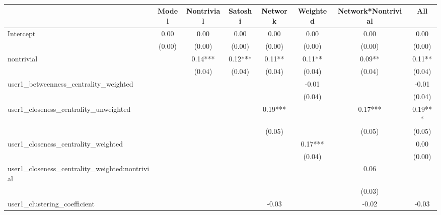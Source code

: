 \begin{table}
\centering
\caption{}
\begin{center}
\begin{tabular}{lccccccc}
\hline
                                               & Model    & Nontrivial & Satoshi & Network & Weighted & Network*Nontrivial &   All    \\
\hline
\hline

Intercept                                      & 0.00     & 0.00       & 0.00    & 0.00    & 0.00     & 0.00               & 0.00     \\
                                               & (0.00)   & (0.00)     & (0.00)  & (0.00)  & (0.00)   & (0.00)             & (0.00)   \\
nontrivial                                     &          & 0.14***    & 0.12*** & 0.11**  & 0.11**   & 0.09**             & 0.11**   \\
                                               &          & (0.04)     & (0.04)  & (0.04)  & (0.04)   & (0.04)             & (0.04)   \\
user1_betweenness_centrality_weighted          &          &            &         &         & -0.01    &                    & -0.01    \\
                                               &          &            &         &         & (0.04)   &                    & (0.04)   \\
user1_closeness_centrality_unweighted          &          &            &         & 0.19*** &          & 0.17***            & 0.19***  \\
                                               &          &            &         & (0.05)  &          & (0.05)             & (0.05)   \\
user1_closeness_centrality_weighted            &          &            &         &         & 0.17***  &                    & 0.00     \\
                                               &          &            &         &         & (0.04)   &                    & (0.00)   \\
user1_closeness_centrality_weighted:nontrivial &          &            &         &         &          & 0.06               &          \\
                                               &          &            &         &         &          & (0.03)             &          \\
user1_clustering_coefficient                   &          &            &         & -0.03   &          & -0.02              & -0.03    \\

\end{tabular}
\end{center}
\end{table}
